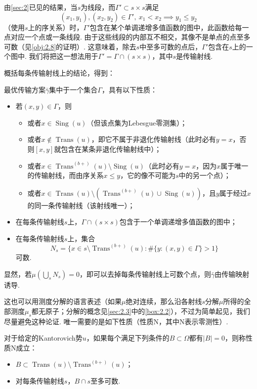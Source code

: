 由\autoref{sec:2}已见的结果，当$s$为线段，而$\Gamma'\subset s\times s$满足
\[
(x_1,y_1),(x_2,y_2)\in\Gamma',\ x_1<x_2\implies y_1\le y_2
\]
（使用$s$上的序关系）时，$\Gamma'$包含在某个单调递增多值函数的图中，此函数给每一点对应一个点或一条线段. 由于这些线段的内部互不相交，其像不是单点的点至多可数（见\autoref{obj:2.8}的证明）. 这意味着，除去$s$中至多可数的点后，$\Gamma'$包含在$s$上的一个图中. 我们将把这一想法用于$\Gamma'=\Gamma\cap(s\times s)$，其中$s$是传输射线.

概括每条传输射线上的结论，得到：
\begin{proposition}\label{obj:3.10}
最优传输方案$\bar\gamma$集中于一个集合$\Gamma$，具有以下性质：
\begin{itemize}
\item 若$(x,y)\in\Gamma$，则
\begin{itemize}
\item 或者$x\in\operatorname{Sing}(u)$（但该点集为Lebesgue零测集）；
\item 或者$x\notin\operatorname{Trans}(u)$，即它不属于非退化传输射线（此时必有$y=x$，否则$[x,y]$就包含在某条非退化传输射线中）；
\item 或者$x\in\operatorname{Trans}^{(b+)}(u)\setminus\operatorname{Sing}(u)$（此时必有$y=x$，因为$x$属于唯一的传输射线，而由序关系$x\le y$，它的像不可能为$s$中的另一个点）；
\item 或者$x\in\operatorname{Trans}(u)\setminus(\operatorname{Trans}^{(b+)}(u)\cup\operatorname{Sing}(u))$，且$y$属于经过$x$的同一条传输射线（该射线唯一）；
\end{itemize}
\item 在每条传输射线$s$上，$\Gamma\cap(s\times s)$包含于一个单调递增多值函数的图中；
\item 在每条传输射线$s$上，集合
\[
N_s=\{x\in s\setminus\operatorname{Trans}^{(b+)}(u):\#\{y:(x,y)\in\Gamma\}>1\}
\]
可数.
\end{itemize}
显然，若$\mu(\bigcup_sN_s)=0$，即可以去掉每条传输射线上可数个点，则$\bar\gamma$由传输映射诱导.
\end{proposition}

这也可以用测度分解的语言表述（如果$\mu$绝对连续，那么沿各射线$s$分解$\mu$所得的全部测度$\mu_s$都无原子；分解的概念见\autoref{sec:2.3}中的\autoref{box:2.2}），不过为简单起见，我们尽量避免这种论证. 唯一需要的是如下性质（性质N，其中N表示零测性）.

\begin{definition}\label{obj:3.11}
对于给定的Kantorovich势$u$，如果每个满足下列条件的$B\subset\Omega$都有$|B|=0$，则称性质N成立：
\begin{itemize}
\item $B\subset\operatorname{Trans}(u)\setminus\operatorname{Trans}^{(b+)}(u)$；
\item 对每条传输射线$s$，$B\cap s$至多可数.
\end{itemize}
\end{definition}

